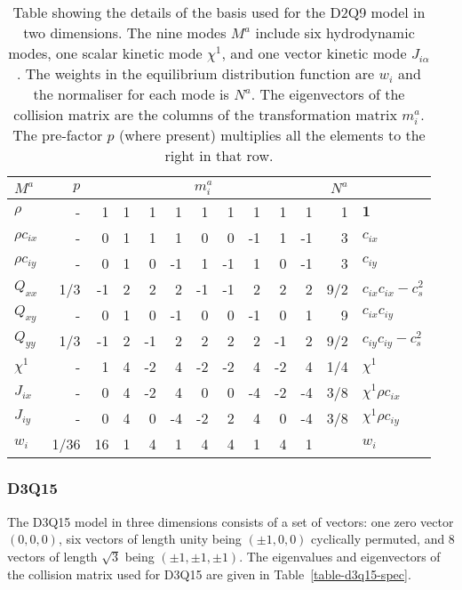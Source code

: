 \begin{table}[t]
\begin{center}
\begin{tabular}{|l|r|rrrrrrrrr|r|l|}
\hline\hline
$M^a$ & $p$ & \multicolumn{9}{c|}{$m_i^a$} & $N^a$  &\\
\hline
$\rho$ & - & 1 &  1 &  1 &  1 &  1 &  1 &  1 &   1 &  1 & 1 &$\mathbf{1}$ \\
\hline
$\rho c_{ix}$ & - & 0 &  1 &  1 & 1 & 0 &  0 & -1 &  1 & -1 & 3 & $c_{ix}$ \\
\hline
$\rho c_{iy}$ & - & 0 & 1 &  0 &  -1 &  1 &  -1 & 1 & 0 & -1 & 3  &$c_{iy}$ \\
\hline
$Q_{xx}$ & 1/3 & -1 &  2 &  2 & 2 & -1 & -1 & 2 & 2 & 2 & 9/2 
& $c_{ix} c_{ix} - c_s^2$ \\
\hline
$Q_{xy}$ & - & 0 &  1 & 0 & -1 & 0 & 0 & -1 & 0 & 1 & 9 & $c_{ix} c_{iy}$ \\
\hline
$Q_{yy}$ & 1/3 & -1 &  2 & -1 & 2 & 2 & 2 & 2 & -1 & 2 & 9/2
& $c_{iy} c_{iy} - c_s^2$ \\
\hline\hline
$\chi^1$ & - &  1 & 4 & -2 & 4 & -2 & -2 & 4 & -2 & 4 & 1/4 & $\chi^1$ \\
\hline
$J_{ix}$ & - & 0 &  4 & -2 & 4 & 0 & 0 & -4 & -2 & -4 & 3/8
& $\chi^1 \rho c_{ix}$\\
\hline
$J_{iy}$ & - & 0 & 4 & 0 & -4 & -2 & 2 & 4 & 0 & -4 & 3/8
& $\chi^1 \rho c_{iy}$\\
\hline\hline
$w_i$ & 1/36 & 16 & 1 & 4 & 1 & 4 & 4 & 1 & 4 & 1 & & $w_i$\\
\hline\hline
\end{tabular}
\end{center}
\caption{Table showing the details of the basis used for the D2Q9 model
in two dimensions. The nine modes $M^a$ include six hydrodynamic modes,
one scalar kinetic mode $\chi^1$, and one vector kinetic mode $J_{i\alpha}$.
The weights in the equilibrium distribution function are $w_i$ and the
normaliser for each mode is $N^a$. The eigenvectors of the collision
matrix are the columns of the transformation matrix $m^a_i$. The pre-factor
$p$ (where present) multiplies all the elements to the right in that row.}
\label{table-d2q9-spec}
\end{table}



\subsubsection{D3Q15}

The D3Q15 model in three dimensions consists of a set of vectors:
one zero vector $(0,0,0)$, six vectors of length unity being
$(\pm 1, 0, 0)$ cyclically permuted, and 8 vectors of length
$\sqrt{3}$ being $(\pm 1, \pm 1, \pm 1)$.
The eigenvalues and eigenvectors of the collision
matrix used for D3Q15 are given in Table~\ref{table-d3q15-spec}.


